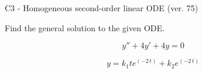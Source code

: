 \begin{exercise}
  \begin{exerciseTitle}C3 - Homogeneous second-order linear ODE (ver. 75)\end{exerciseTitle}
  \begin{exerciseStatement}
    
Find the general solution to the given ODE.

    
\[y''+4y'+4y = 0\]

  \end{exerciseStatement}
  \begin{exerciseAnswer}
    
\[y= k_{1} t e^{\left(-2 \, t\right)} + k_{2} e^{\left(-2 \, t\right)}\]

  \end{exerciseAnswer}
\end{exercise}
